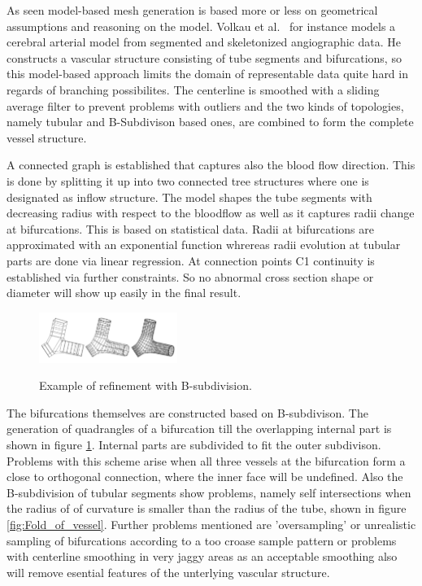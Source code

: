 As seen model-based mesh generation is based more or less on geometrical assumptions and reasoning on the model.
Volkau et al.~\cite{volkau2005geometric} for instance models a cerebral arterial model from segmented and skeletonized angiographic data. He constructs a vascular structure consisting of tube segments and bifurcations, so this model-based approach limits the domain of representable data quite hard in regards of branching possibilites. The centerline is smoothed with a sliding average filter to prevent problems with outliers and the two kinds of topologies, namely tubular and B-Subdivison based ones, are combined to form the complete vessel structure.

A connected graph is established that captures also the blood flow direction. This is done by splitting it up into two connected tree structures where one is designated as inflow structure. The model shapes the tube segments with decreasing radius with respect to the bloodflow as well as it captures radii change at bifurcations. This is based on statistical data. Radii at bifurcations are approximated with an exponential function whrereas radii evolution at tubular parts are done via linear regression. At connection points C1 continuity is established via further constraints. So no abnormal cross section shape or diameter will show up easily in the final result.

\begin{figure}[h]
	\centering
	\includegraphics[width=0.4\textwidth]{./Images/B-subdivision_refinement.png} \\
	\caption{Example of refinement with B-subdivision.}
	\cite{volkau2005geometric}
	\label{fig:B-subdivision_refinement}
\end{figure}

The bifurcations themselves are constructed based on B-subdivison. The generation of quadrangles of a bifurcation till the overlapping internal part is shown in figure \ref{fig:B-subdivision_refinement}. Internal parts are subdivided to fit the outer subdivison. Problems with this scheme arise when all three vessels at the bifurcation form a close to orthogonal connection, where the inner face will be undefined. Also the B-subdivision of tubular segments show problems, namely self intersections when the radius of of curvature is smaller than the radius of the tube, shown in figure \ref{fig:Fold_of_vessel}.
Further problems mentioned are 'oversampling' or unrealistic sampling of bifurcations according to a too croase sample pattern or problems with centerline smoothing in very jaggy areas as an acceptable smoothing also will remove esential features of the unterlying vascular structure.  

